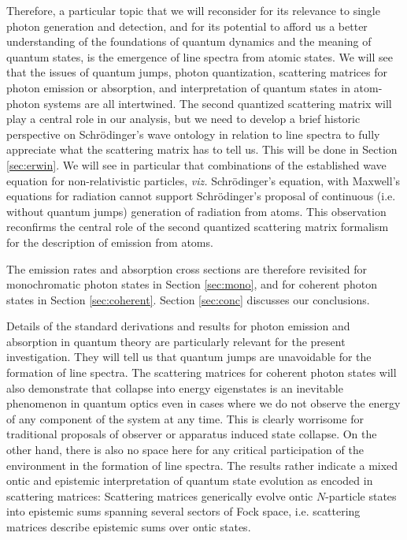 \documentclass[final,3p,times,twocolumn]{elsarticle3}
\begin{document}
Therefore, a particular topic that we will reconsider for its relevance to 
single photon generation and detection, and for its potential to afford us a 
better understanding of the foundations of quantum dynamics and the meaning of 
quantum states, is the emergence of line spectra from atomic states. We will see 
that the issues of quantum jumps, photon quantization, scattering matrices for 
photon emission or absorption, and interpretation of quantum states in atom-photon 
systems are all intertwined. The second quantized scattering matrix will play a 
central role in our analysis, but we need to develop a brief historic perspective 
on Schr\"odinger's wave ontology in relation to line spectra to fully appreciate 
what the scattering matrix has to tell us. This will be done in Section \ref{sec:erwin}.
We will see in particular that combinations of the established wave equation for
non-relativistic particles, \textit{viz.} Schr\"odinger's equation, with Maxwell's 
equations for radiation cannot support Schr\"odinger's proposal of continuous
(i.e. without quantum jumps) generation of radiation from atoms. This observation
reconfirms the central role of the second quantized scattering matrix formalism for
the description of emission from atoms. 

The emission rates and absorption cross sections are therefore revisited for 
mono\-chro\-matic photon states in Section \ref{sec:mono}, and for coherent photon 
states in Section \ref{sec:coherent}. Section \ref{sec:conc} discusses our conclusions.

Details of the standard derivations and results for photon emission and absorption 
in quantum theory are particularly relevant for the present investigation.
They will tell us that quantum jumps are unavoidable for the formation of line
spectra. The scattering matrices for coherent photon states will also
demonstrate that collapse into energy eigenstates is an inevitable phenomenon
in quantum optics even in cases where we do not observe the energy of any 
component of the system at any time. This is clearly worrisome for traditional
proposals of observer or apparatus induced state collapse. On the other hand,
there is also no space here for any critical participation of the environment
in the formation of line spectra. The results rather indicate a mixed ontic
and epistemic interpretation of quantum state evolution as encoded in scattering
matrices: Scattering matrices generically evolve ontic $N$-particle states
into epistemic sums spanning several sectors of Fock space, i.e. scattering
matrices describe epistemic sums over ontic states.
\end{document}
